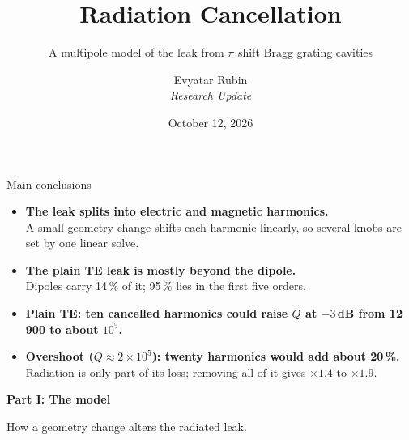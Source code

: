 \documentclass[11pt, aspectratio=169]{beamer}
\title[Radiation Cancellation]{Radiation Cancellation}
\subtitle{\texorpdfstring{A multipole model of the leak from $\pi$ shift Bragg grating cavities}{A multipole model of the leak from pi shift Bragg grating cavities}}
\author[Evyatar Rubin]{\texorpdfstring{Evyatar Rubin \\ \textit{Research Update}}{Evyatar Rubin}}
\date{October 12, 2026}
\begin{document}
\begin{frame}
    \titlepage
\end{frame}

\begin{frame}{Main conclusions}
    \begin{itemize}
        \setlength{\itemsep}{0.30cm}
        \item \textbf{The leak splits into electric and magnetic harmonics.}\\
              {\footnotesize A small geometry change shifts each harmonic linearly, so several knobs are set by one linear solve.}
        \item \textbf{The plain TE leak is mostly beyond the dipole.}\\
              {\footnotesize Dipoles carry 14\,\% of it; 95\,\% lies in the first five orders.}
        \item \textbf{Plain TE: ten cancelled harmonics could raise $Q$ at $-3$\,dB from 12\,900 to about $10^5$.}
        \item \textbf{Overshoot ($Q\approx2\times10^5$): twenty harmonics would add about 20\,\%.}\\
              {\footnotesize Radiation is only part of its loss; removing all of it gives $\times1.4$ to $\times1.9$.}
    \end{itemize}
\end{frame}

\begin{frame}
    \vfill
    \begin{center}
        {\Large \textbf{Part I: The model}}
        \vspace{0.5cm}

        \large How a geometry change alters the radiated leak.
    \end{center}
    \vfill
\end{frame}
\end{document}
